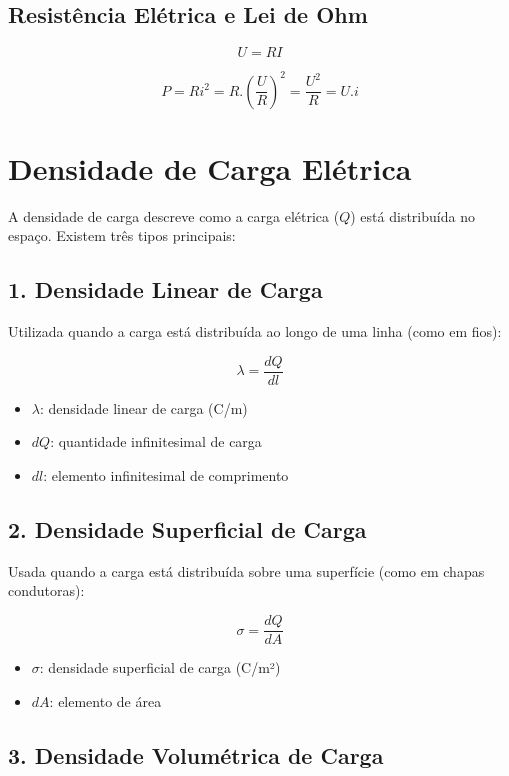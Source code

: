 \documentclass[a4paper,12pt]{article}
\begin{document}
\begin{multicols}{2}
\subsection{Resistência Elétrica e Lei de Ohm}
\[
    U = R I
\]

\[ 
P = Ri^{2} = R.\left(\frac{U}{R}\right)^{2} = \frac{U^{2}}{R} = U.i
\]

\section*{Densidade de Carga Elétrica}

A densidade de carga descreve como a carga elétrica ($Q$) está distribuída no espaço. Existem três tipos principais:

\subsection*{1. Densidade Linear de Carga}

Utilizada quando a carga está distribuída ao longo de uma linha (como em fios):

\[
\lambda = \frac{dQ}{dl}
\]

\begin{itemize}
    \item $\lambda$: densidade linear de carga (C/m)
    \item $dQ$: quantidade infinitesimal de carga
    \item $dl$: elemento infinitesimal de comprimento
\end{itemize}

\subsection*{2. Densidade Superficial de Carga}

Usada quando a carga está distribuída sobre uma superfície (como em chapas condutoras):

\[
\sigma = \frac{dQ}{dA}
\]

\begin{itemize}
    \item $\sigma$: densidade superficial de carga (C/m²)
    \item $dA$: elemento de área
\end{itemize}

\subsection*{3. Densidade Volumétrica de Carga}


\end{multicols}
\end{document}
